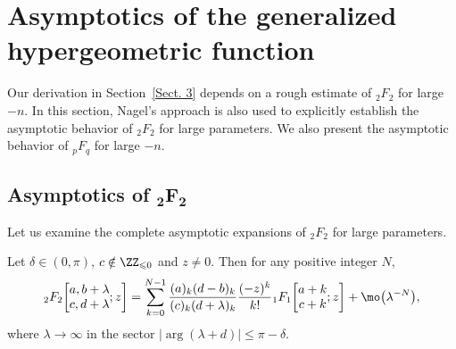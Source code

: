 \section{Asymptotics of the generalized hypergeometric function}\label{Sect. 4}
Our derivation in Section~\ref{Sect. 3} depends on a rough estimate of $_2F_2$ for large $-n$. In this section, Nagel's approach is also used to explicitly establish the asymptotic behavior of $_2F_2$ for large parameters. We also present the asymptotic behavior of $_pF_q$ for large $-n$.

\subsection[Asymptotics of \_2F\_2]{Asymptotics of $\boldsymbol{_2F_2}$}
Let us examine the complete asymptotic expansions of $_2F_2$ for large parameters.

\begin{Theorem}\label{Thm: 2F2 large parameter--lambda}
	Let $\delta\in (0,\pi)$, $c\notin\ZZ_{\leqslant 0}$ and $z\ne 0$. Then for any positive integer $N$,
	\begin{equation}\label{2F2 large parameter--lambda}
		{}_2F_2\biggl[\begin{matrix}
			a,b+\lambda\\
			c,d+\lambda
		\end{matrix};z\biggr]=\sum_{k=0}^{N-1}\frac{(a)_k (d-b )_k}{(c)_k (d+\lambda )_k}\frac{ (-z )^k}{k!}{}_1F_1\biggl[\begin{matrix}
			a+k\\
			c+k
		\end{matrix};z\biggr]+\mo \bigl(\lambda^{-N} \bigr),
	\end{equation}
	where $\lambda\to\infty$ in the sector $|{\arg}(\lambda+d)|\leqslant \pi-\delta$.
\end{Theorem}

